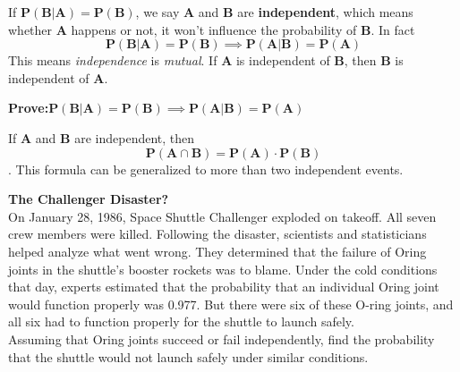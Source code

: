\documentclass[a4paper, 12pt,twoside]{book}
\begin{document}
If $\textbf{P}(\textbf{B} | \textbf{A})=\textbf{P}(\textbf{B})$, we say \textbf{A} and \textbf{B} are \textbf{independent}, which means whether \textbf{A} happens or not, it won't influence the probability of \textbf{B}. In fact 
$$\textbf{P}(\textbf{B} | \textbf{A})=\textbf{P}(\textbf{B})
   \implies \textbf{P}(\textbf{A} | \textbf{B})=\textbf{P}(\textbf{A})$$
   This means \textit{independence} is \textit{mutual}. If \textbf{A} is independent of \textbf{B}, then \textbf{B} is independent of \textbf{A}.
   \vspace{0.6cm}

\hspace{-0.5cm}
 \colorbox{champagne}{\parbox{\textwidth}{
 \textbf{Prove:}\hspace{0.6cm}$\textbf{P}(\textbf{B} | \textbf{A})=\textbf{P}(\textbf{B})
   \implies \textbf{P}(\textbf{A} | \textbf{B})=\textbf{P}(\textbf{A})$
 }}
\newpage
If \textbf{A} and \textbf{B} are independent, then $$\textbf{P}(\textbf{A} \cap \textbf{B}) = \textbf{P}(\textbf{A}) \cdot \textbf{P}(\textbf{B})$$. 
\noindent This formula can be generalized to more than two independent events.
\vspace{0.6cm}\\

\hspace{-0.5cm}
\colorbox{champagne}{\parbox{\textwidth}{
 \textbf{The Challenger Disaster?}
 \vspace{0.3cm}\\
 On January 28, 1986, Space Shuttle Challenger exploded on takeoff. All seven crew members were killed. Following the disaster, scientists and statisticians helped analyze what went wrong. They determined that the failure of O\textendash ring joints in the shuttle’s booster rockets was to blame. Under the cold conditions that day, experts estimated that the probability that an individual O\textendash ring joint would function properly was 0.977. But there were six of these O-ring joints, and all six had to function properly for the shuttle to launch safely.
 \vspace{0.3cm}\\
  Assuming that O\textendash ring joints succeed or fail independently, find the probability that the shuttle would not launch safely under similar conditions.
  }}
\newpage
\end{document}
